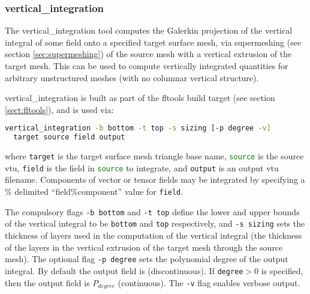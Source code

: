 
\subsubsection{vertical\_integration}
\label{sect:vertical_integration}

The vertical\_integration tool computes the Galerkin projection of the vertical
integral of some field onto a specified target surface mesh, via supermeshing (see section \ref{sec:supermeshing})
of the source mesh with a vertical extrusion of the target mesh. This can be used to
compute vertically integrated quantities for arbitrary unstructured meshes (with
no columnar vertical structure).

vertical\_integration is built as part of the fltools build target (see section \ref{sect:fltools}),
and is used via:

\begin{lstlisting}[language = Bash]
vertical_integration -b bottom -t top -s sizing [-p degree -v]
  target source field output
\end{lstlisting}

where \lstinline[language = Bash]+target+ is the target surface mesh triangle base name,
\lstinline[language = Bash]+source+ is the source vtu, \lstinline[language = Bash]+field+
is the field in \lstinline[language = Bash]+source+ to integrate, and \lstinline[language = Bash]+output+
is an output vtu filename. Components of vector or tensor fields may be integrated
by specifying a \% delimited ``field\%component'' value for \lstinline[language = Bash]+field+.

The compulsory flags \lstinline[language = Bash]+-b bottom+
and \lstinline[language = Bash]+-t top+ define the lower and upper bounds of
the vertical integral to be \lstinline[language = Bash]+bottom+ and \lstinline[language = Bash]+top+
respectively, and \lstinline[language = Bash]+-s sizing+ sets the thickness of layers
used in the computation of the vertical integral (the thickness of the layers in the
vertical extrusion of the target mesh through the source mesh). The optional
flag \lstinline[language = Bash]+-p degree+ sets the polynomial degree of the
output integral. By default the output field is \Pzero (discontinuous).
If \lstinline[language = Bash]+degree+$> 0$ is specified, then the output
field is \ensuremath{P_{degree}} (continuous). The
\lstinline[language = Bash]+-v+ flag enables verbose output.

